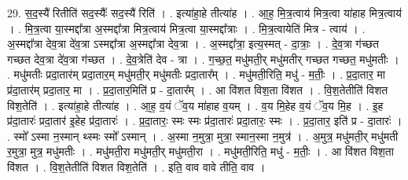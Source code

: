 \documentclass[17pt]{extarticle}
\begin{document}
29. स॒द॒स्यै॑ रितीति॑ सद॒स्यैः᳚ सद॒स्यै॑ रिति॑ । . इत्या॑हा॒हे तीत्या॑ह । . आ॒ह॒ मि॒त्र॒त्वाय॑ मित्र॒त्वा या॑हाह मित्र॒त्वाय॑ । . मि॒त्र॒त्वा या॒स्मद्दा᳚त्रा अ॒स्मद्दा᳚त्रा मित्र॒त्वाय॑ मित्र॒त्वा या॒स्मद्दा᳚त्राः । . मि॒त्र॒त्वायेति॑ मित्र - त्वाय॑ । . अ॒स्मद्दा᳚त्रा देव॒त्रा दे॑व॒त्रा ऽस्मद्दा᳚त्रा अ॒स्मद्दा᳚त्रा देव॒त्रा । . अ॒स्मद्दा᳚त्रा॒ इत्य॒स्मत् - दा॒त्राः॒ । . दे॒व॒त्रा ग॑च्छत गच्छत देव॒त्रा दे॑व॒त्रा ग॑च्छत । . दे॒व॒त्रेति॑ देव - त्रा । . ग॒च्छ॒त॒ मधु॑मती॒र् मधु॑मतीर् गच्छत गच्छत॒ मधु॑मतीः । . मधु॑मतीः प्रदा॒तार॑म् प्रदा॒तार॒म् मधु॑मती॒र् मधु॑मतीः प्रदा॒तार᳚म् । . मधु॑मती॒रिति॒ मधु॑ - म॒तीः॒ । . प्र॒दा॒तार॒ मा प्र॑दा॒तार॑म् प्रदा॒तार॒ मा । . प्र॒दा॒तार॒मिति॑ प्र - दा॒तार᳚म् । . आ वि॑शत विश॒ता वि॑शत । . वि॒श॒तेतीति॑ विशत विश॒तेति॑ । . इत्या॑हा॒हे तीत्या॑ह । . आ॒ह॒ व॒यं ॅव॒य मा॑हाह व॒यम् । . व॒य मि॒हेह व॒यं ॅव॒य मि॒ह । . इ॒ह प्र॑दा॒तारः॑ प्रदा॒तार॑ इ॒हेह प्र॑दा॒तारः॑ । . प्र॒दा॒तारः॒ स्मः स्मः प्र॑दा॒तारः॑ प्रदा॒तारः॒ स्मः । . प्र॒दा॒तार॒ इति॑ प्र - दा॒तारः॑ । . स्मो᳚ ऽस्मा न॒स्मान् थ्स्मः स्मो᳚ ऽस्मान् । . अ॒स्मा न॒मुत्रा॒ मुत्रा॒ स्मान॒स्मा न॒मुत्र॑ । . अ॒मुत्र॒ मधु॑मती॒र् मधु॑मती र॒मुत्रा॒ मुत्र॒ मधु॑मतीः । . मधु॑मती॒रा मधु॑मती॒र् मधु॑मती॒रा । . मधु॑मती॒रिति॒ मधु॑ - म॒तीः॒ । . आ वि॑शत विश॒ता वि॑शत । . वि॒श॒तेतीति॑ विशत विश॒तेति॑ । . इति॒ वाव वावे तीति॒ वाव । \newline
\end{document}

